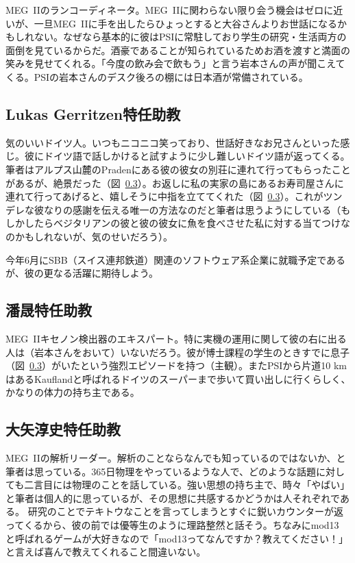 MEG~IIのランコーディネータ。MEG~IIに関わらない限り会う機会はゼロに近いが、一旦MEG~IIに手を出したらひょっとすると大谷さんよりお世話になるかもしれない。なぜなら基本的に彼はPSIに常駐しており学生の研究・生活両方の面倒を見ているからだ。酒豪であることが知られているためお酒を渡すと満面の笑みを見せてくれる。「今度の飲み会で飲もう」と言う岩本さんの声が聞こえてくる。PSIの岩本さんのデスク後ろの棚には日本酒が常備されている。



\subsection{Lukas Gerritzen特任助教}

気のいいドイツ人。いつもニコニコ笑っており、世話好きなお兄さんといった感じ。彼にドイツ語で話しかけると試すように少し難しいドイツ語が返ってくる。筆者はアルプス山麓のPradenにある彼の彼女の別荘に連れて行ってもらったことがあるが、絶景だった（図~\ref{}）。お返しに私の実家の島にあるお寿司屋さんに連れて行ってあげると、嬉しそうに中指を立ててくれた（図~\ref{}）。これがツンデレな彼なりの感謝を伝える唯一の方法なのだと筆者は思うようにしている（もしかしたらベジタリアンの彼と彼の彼女に魚を食べさせた私に対する当てつけなのかもしれないが、気のせいだろう）。



今年6月にSBB（スイス連邦鉄道）関連のソフトウェア系企業に就職予定であるが、彼の更なる活躍に期待しよう。

\subsection{潘晟特任助教}

MEG~IIキセノン検出器のエキスパート。特に実機の運用に関して彼の右に出る人は（岩本さんをおいて）いないだろう。彼が博士課程の学生のときすでに息子（図~\ref{}）がいたという強烈エピソードを持つ（主観）。またPSIから片道10 kmはあるKauflandと呼ばれるドイツのスーパーまで歩いて買い出しに行くらしく、かなりの体力の持ち主である。


\subsection{大矢淳史特任助教}

MEG~IIの解析リーダー。解析のことならなんでも知っているのではないか、と筆者は思っている。365日物理をやっているような人で、どのような話題に対しても二言目には物理のことを話している。強い思想の持ち主で、時々「やばい」と筆者は個人的に思っているが、その思想に共感するかどうかは人それぞれである。%
研究のことでテキトウなことを言ってしまうとすぐに鋭いカウンターが返ってくるから、彼の前では優等生のように理路整然と話そう。ちなみにmod13%
と呼ばれるゲームが大好きなので「mod13ってなんですか？教えてください！」と言えば喜んで教えてくれること間違いない。

